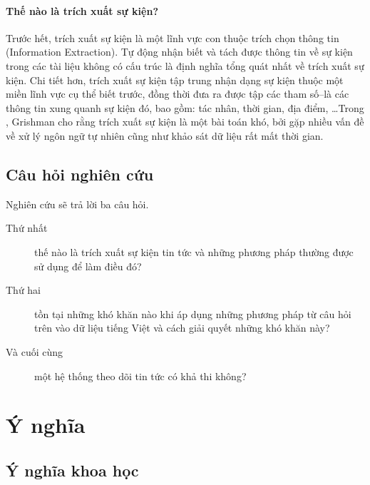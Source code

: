 \paragraph{Thế nào là trích xuất sự kiện?} Trước hết, trích xuất sự kiện là một lĩnh vực con thuộc trích chọn thông tin (Information Extraction). Tự động nhận biết và tách được thông tin về sự kiện trong các tài liệu không có cấu trúc là định nghĩa tổng quát nhất về trích xuất sự kiện. Chi tiết hơn, trích xuất sự kiện tập trung nhận dạng sự kiện thuộc một miền lĩnh vực cụ thể biết trước, đồng thời đưa ra được tập các tham số--là các thông tin xung quanh sự kiện đó, bao gồm: tác nhân, thời gian, địa điểm, \ldots Trong \cite{RG10}, Grishman cho rằng trích xuất sự kiện là một bài toán khó, bởi gặp nhiều vấn đề về xử lý ngôn ngữ tự nhiên cũng như khảo sát dữ liệu rất mất thời gian.


\subsection{Câu hỏi nghiên cứu}
 \noindent Nghiên cứu sẽ trả lời ba câu hỏi.
 \begin{description}
 \item[Thứ nhất] thế nào là trích xuất sự kiện tin tức và những phương pháp thường được sử dụng để làm điều đó?
\item[Thứ hai] tồn tại những khó khăn nào  khi áp dụng những phương pháp từ câu hỏi trên vào dữ liệu tiếng Việt và cách giải quyết những khó khăn này?
\item[Và cuối cùng] một hệ thống theo dõi tin tức có khả thi không?
 \end{description}

\section{Ý nghĩa}
    \label{meaning}
    \subsection{Ý nghĩa khoa học}

